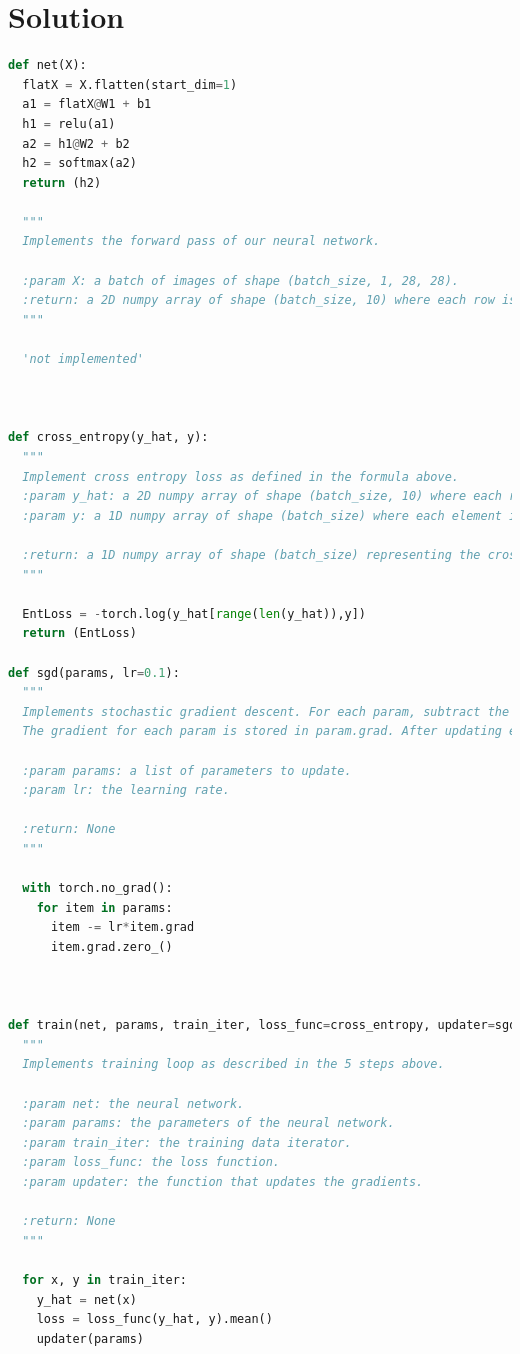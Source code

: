 \documentclass[submit]{harvardml}
\newenvironment{answer}
  {\section*{Solution}}
{}
\begin{document}
\begin{answer}
\begin{enumerate}
\begin{lstlisting}[language=Python]
def net(X):
  flatX = X.flatten(start_dim=1)
  a1 = flatX@W1 + b1
  h1 = relu(a1)
  a2 = h1@W2 + b2
  h2 = softmax(a2)
  return (h2)
  
  """
  Implements the forward pass of our neural network. 
  
  :param X: a batch of images of shape (batch_size, 1, 28, 28).
  :return: a 2D numpy array of shape (batch_size, 10) where each row is a probability vector of length 10.
  """
  
  'not implemented'



def cross_entropy(y_hat, y):
  """
  Implement cross entropy loss as defined in the formula above.
  :param y_hat: a 2D numpy array of shape (batch_size, 10) where each row is a probability vector of length 10.
  :param y: a 1D numpy array of shape (batch_size) where each element is a label.

  :return: a 1D numpy array of shape (batch_size) representing the cross entropy losses.
  """

  EntLoss = -torch.log(y_hat[range(len(y_hat)),y])
  return (EntLoss)

def sgd(params, lr=0.1):
  """
  Implements stochastic gradient descent. For each param, subtract the gradient times the learning rate.
  The gradient for each param is stored in param.grad. After updating each param, set its gradient to zero.

  :param params: a list of parameters to update.
  :param lr: the learning rate.

  :return: None
  """
  
  with torch.no_grad():
    for item in params:
      item -= lr*item.grad
      item.grad.zero_()



def train(net, params, train_iter, loss_func=cross_entropy, updater=sgd):
  """
  Implements training loop as described in the 5 steps above.

  :param net: the neural network.
  :param params: the parameters of the neural network.
  :param train_iter: the training data iterator.
  :param loss_func: the loss function.
  :param updater: the function that updates the gradients.

  :return: None
  """
  
  for x, y in train_iter:
    y_hat = net(x) 
    loss = loss_func(y_hat, y).mean() 
    updater(params) 

\end{lstlisting}


\end{enumerate}
\end{answer}
\end{document}
